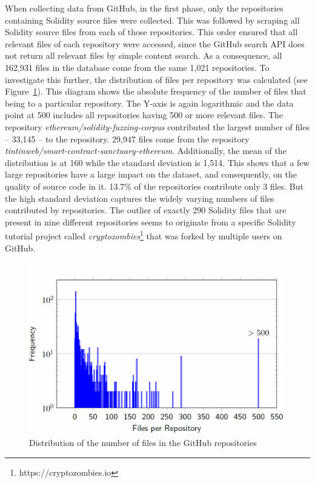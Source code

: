 \documentclass[10pt,conference]{IEEEtran}
\begin{document}
	When collecting data from GitHub, in the first phase, only the repositories containing Solidity source files were collected. This was followed by scraping all Solidity source files from each of those repositories. This order ensured that all relevant files of each repository were accessed, since the GitHub search API does not return all relevant files by simple content search. As a consequence, all 162,931 files in the database come from the same 1,021 repositories. To investigate this further, the distribution of files per repository was calculated (see Figure~\ref{fig:number}). This diagram shows the absolute frequency of the number of files that being to a particular repository. The Y-axis is again logarithmic and the data point at 500 includes all repositories having 500 or more relevant files. The repository \textit{ethereum/solidity-fuzzing-corpus} contributed the largest number of files -- 33,145 -- to the repository. 29,947 files come from the repository \textit{tintinweb/smart-contract-sanctuary-ethereum}. Additionally, the mean of the distribution is at 160 while the standard deviation is 1,514. This shows that a few large repositories have a large impact on the dataset, and consequently, on the quality of source code in it. 13.7\% of the repositories contribute only 3 files. But the high standard deviation captures the widely varying numbers of files contributed by repositories. The outlier of exactly 290 Solidity files that are present in nine different repositories seems to originate from a specific Solidity tutorial project called \textit{cryptozombies}\footnote{https://cryptozombies.io} that was forked by multiple users on GitHub.
	\begin{figure}[!h]
		\centering
		\includegraphics[scale=0.3]{distr_files_repos.png}
		\caption{Distribution of the number of files in the GitHub repositories}
		\label{fig:number}
	\end{figure}
	
\end{document}
